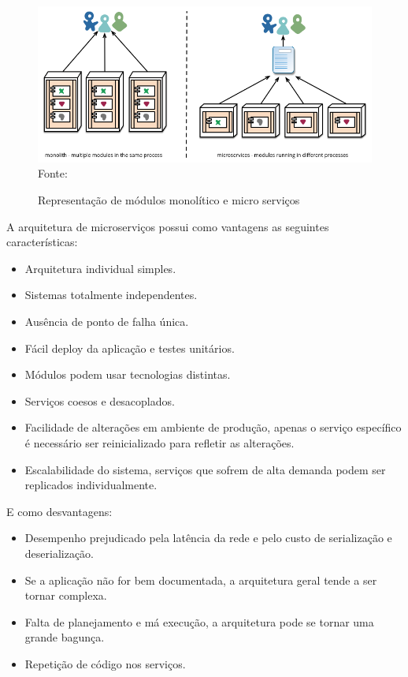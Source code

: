 \begin{figure}[!htpb]
	\centering
	\caption{Representação de módulos monolítico e micro serviços}
	\includegraphics[width=14cm]{images/micro-deployment.png}\\
	{\footnotesize Fonte: \cite{microservices2014}}
 	\label{f_c2_app_monolitica_vs_microservices}
\end{figure}

A arquitetura de microserviços possui como vantagens as seguintes características:
\begin{itemize}
	\item Arquitetura individual simples.
	\item Sistemas totalmente independentes.
	\item Ausência de ponto de falha única.
	\item Fácil deploy da aplicação e testes unitários.
	\item Módulos podem usar tecnologias distintas.
	\item Serviços coesos e desacoplados.
	\item Facilidade de alterações em ambiente de produção, apenas o serviço específico é necessário ser reinicializado para refletir as alterações.
	\item Escalabilidade do sistema, serviços que sofrem de alta demanda podem ser replicados individualmente.
\end{itemize}

\newpage
E como desvantagens:
\begin{itemize}
	\item Desempenho prejudicado pela latência da rede e pelo custo de serialização e deserialização.
	\item Se a aplicação não for bem documentada, a arquitetura geral tende a ser tornar complexa.
	\item Falta de planejamento e má execução, a arquitetura pode se tornar uma grande bagunça.
	\item Repetição de código nos serviços.
\end{itemize}

